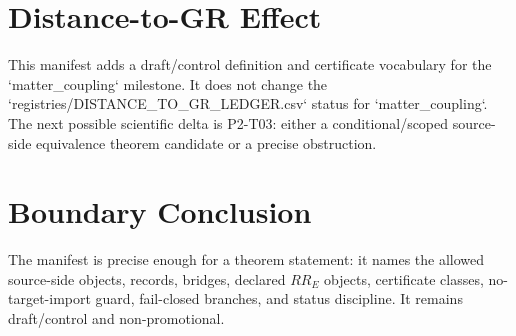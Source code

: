 \documentclass[11pt]{article}
\begin{document}
\section{Distance-to-GR Effect}

This manifest adds a draft/control definition and certificate vocabulary for
the `matter_coupling` milestone. It does not change the
`registries/DISTANCE_TO_GR_LEDGER.csv` status for `matter_coupling`.
The next possible scientific delta is P2-T03: either a conditional/scoped
source-side equivalence theorem candidate or a precise obstruction.

\section{Boundary Conclusion}

The manifest is precise enough for a theorem statement: it names the allowed
source-side objects, records, bridges, declared \(RR_E\) objects, certificate
classes, no-target-import guard, fail-closed branches, and status discipline.
It remains draft/control and non-promotional.
\end{document}
